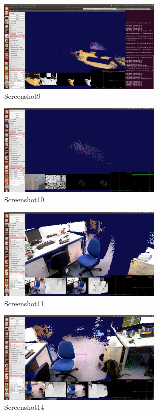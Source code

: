 \documentclass[12pt,twoside]{article}
\begin{document}
\begin{figure}[h]
    \centering
    \includegraphics[width=0.7\textwidth]{figures/Screenshot9}
    \caption{Screenshot9}
    \label{fig:Screenshot9}
\end{figure}


\begin{figure}[h]
    \centering
    \includegraphics[width=0.7\textwidth]{figures/Screenshot10}
    \caption{Screenshot10}
    \label{fig:Screenshot10}
\end{figure}

\begin{figure}[h]
    \centering
    \includegraphics[width=0.7\textwidth]{figures/Screenshot11}
    \caption{Screenshot11}
    \label{fig:Screenshot11}
\end{figure}


\begin{figure}[h]
    \centering
    \includegraphics[width=0.7\textwidth]{figures/Screenshot14}
    \caption{Screenshot14}
    \label{fig:Screenshot14}
\end{figure}
\end{document}
